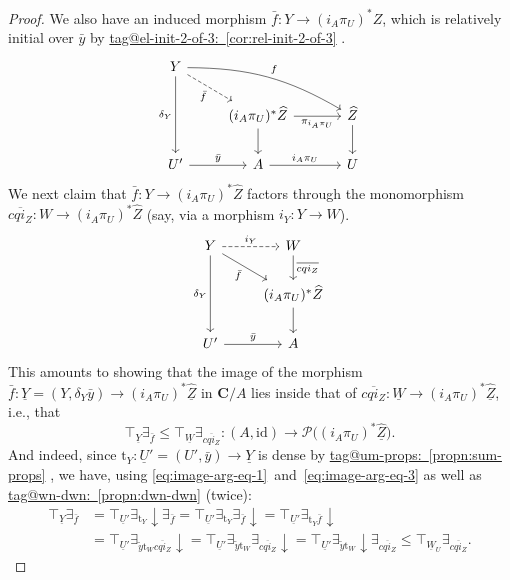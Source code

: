 \documentclass{amsart}
\makeatletter
\newcommand\bC{\mathbf{C}}
\newcommand\dwn{\mathpunct{\downarrow}}
\newcommand\id{\mathrm{id}}
\newcommand\ol[1]{\overline{#1}}
\newcommand\pbig[1]{\big({#1}\big)}
\newcommand\pow{\mathcal{P}}
\newcommand\rt{\mathrm{t}}
\newcommand\und[1]{\underline{#1}}
\newcommand\wh[1]{\widehat{#1}}
\newcommand\tagword[1]{\csname tag@#1\endcsname}
\def\label@tag#1:#2\@nil{#1}
\newcommand\labeltag[1]{\label@tag#1:\@nil}
\newcommand\jref[1]{%
  \texorpdfstring%
    {\hyperref[#1]{\tagword{\labeltag{#1}}~\ref*{#1}}}%
    {\tagword{\labeltag{#1}}~\ref*{#1}}%
}
\theoremstyle{definition}
\theoremstyle{remark}
\theoremstyle{plainwithref}
\makeatother
\begin{document}
\begin{proof}
  We also have an induced morphism \( \bar f \colon Y \to (i_A \pi_U)^* Z \), which is relatively initial over \( \bar y \) by \jref{cor:rel-init-2-of-3}.
  \[
    \begin{tikzcd}
      Y \ar[rrd, bend left=15pt, "f"] \ar[dd, "\delta_Y"'] \ar[rd, "\bar f"', dashed] \\
      & (i_A \pi_U)^* \wh Z \ar[r, "\pi_{i_A \pi_U}"'] \ar[d, ""'] &[10pt] \wh Z \ar[d, ""] \\
      U' \ar[r, "\bar y"] & A \ar[r, "i_A \pi_U"] & U
    \end{tikzcd}
  \]
  We next claim that \( \bar f \colon Y \to (i_A \pi_U)^* \wh Z \) factors through the monomorphism \( \ol{c q i_Z} \colon W \to (i_A \pi_U)^* \wh Z \) (say, via a morphism \( i_Y \colon Y \to W \)).
  \[
    \begin{tikzcd}
      Y \ar[r, "i_Y", dashed] \ar[dd, "\delta_Y"'] \ar[rd, "\bar f"'] & W \ar[d, "\ol{c q i_Z}"] \\
      & (i_A \pi_U)^* \wh Z \ar[d, ""'] \\
      U' \ar[r, "\bar y"] & A
    \end{tikzcd}
  \]
  This amounts to showing that the image of the morphism \( \bar f \colon \und Y = (Y, \delta_Y \bar y) \to (i_A \pi_U)^* \und {\wh Z} \) in \( \bC / A \) lies inside that of \( \ol{c q i_Z} \colon \und W \to (i_A \pi_U)^* \und{\wh Z} \), i.e., that
  \begin{equation} \label{eq:image-arg-eq-3}
    \top_{\und Y} \exists_{\bar f} \le \top_{\und W} \exists_{\ol{c q i_Z}} \colon (A, \id) \to \pow \pbig{(i_A \pi_U)^* \und{\wh Z}}.
  \end{equation}
  And indeed, since \( \rt_Y \colon \und U' = (U', \bar y) \to \und Y \) is dense by \jref{propn:sum-props}, we have, using \eqref{eq:image-arg-eq-1}~and~\eqref{eq:image-arg-eq-3} as well as \jref{propn:dwn-dwn} (twice):
  \[
    \begin{split}
      \top_{\und Y} \exists_{\bar f}
      & = \top_{\und U'} \exists_{\rt_Y} \dwn \exists_{\bar f}
      = \top_{\und U'} \exists_{\rt_Y} \exists_{\bar f} \dwn
      = \top_{\und U'} \exists_{\rt_Y \bar f} \dwn \\
      & = \top_{\und U'} \exists_{\tilde y \rt_W \ol{c q i_Z}} \dwn
      = \top_{\und U'} \exists_{\tilde y \rt_W} \exists_{\ol{c q i_Z}} \dwn
      = \top_{\und U'} \exists_{\tilde y \rt_W} \dwn \exists_{\ol{c q i_Z}}
      \le \top_{\und W_U} \exists_{\ol{c q i_Z}}.
    \end{split}
  \]


\end{proof}
\end{document}
